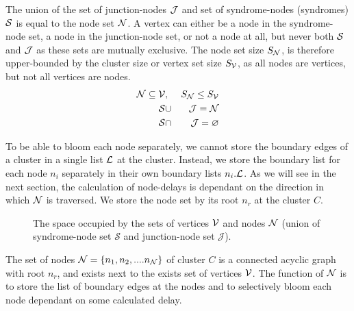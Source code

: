 The union of the set of junction-nodes $\mathcal{J}$ and set of syndrome-nodes (syndromes) $\mathcal{S}$ is equal to the node set $\mathcal{N}$. A vertex can either be a node in the syndrome-node set, a node in the junction-node set, or not a node at all, but never both $\mathcal{S}$ and $\mathcal{J}$ as these sets are mutually exclusive. The node set size $S_{\mathcal{N}}$, is therefore upper-bounded by the cluster size or vertex set size $S_{\mathcal{V}}$, as all nodes are vertices, but not all vertices are nodes.
\begin{eqnarray}
  \mathcal{N} \subseteq \mathcal{V} &,& S_{\mathcal{N}} \leq S_{\mathcal{V}} \label{eq:sets}  \\
  \nonumber \mathcal{S} &\cup& \mathcal{J} = \mathcal{N} \\
  \nonumber \mathcal{S} &\cap& \mathcal{J} = \varnothing
\end{eqnarray}

To be able to bloom each node separately, we cannot store the boundary edges of a cluster in a single list $\mathcal{L}$ at the cluster. Instead, we store the boundary list for each node $n_i$ separately in their own boundary lists $n_i.\mathcal{L}$. As we will see in the next section, the calculation of node-delays is dependant on the direction in which $\mathcal{N}$ is traversed. We store the node set by its root $n_r$ at the cluster $C$.

\begin{figure}[h]
  \centering
  \caption{The space occupied by the sets of vertices $\mathcal{V}$ and nodes $\mathcal{N}$ (union of syndrome-node set $\mathcal{S}$ and junction-node set $\mathcal{J}$).}\label{fig:sets}
\end{figure}

\begin{theorem}
  The set of nodes $\mathcal{N} = \{n_1, n_2, .... n_{\mathcal{N}}\}$ of cluster $C$ is a connected acyclic graph with root $n_r$, and exists next to the exists set of vertices $\mathcal{V}$. The function of $\mathcal{N}$ is to store the list of boundary edges at the nodes and to selectively bloom each node dependant on some calculated delay.
\end{theorem}



